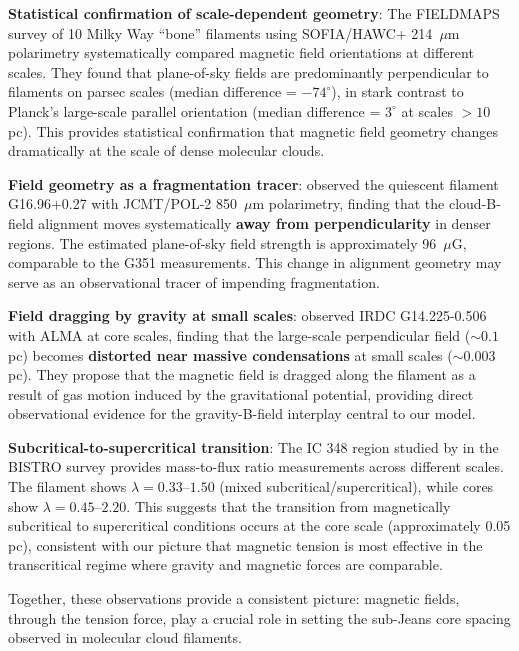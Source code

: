 \documentclass[11pt,a4paper]{article}
\begin{document}
\textbf{Statistical confirmation of scale-dependent geometry}: The FIELDMAPS survey of 10 Milky Way ``bone'' filaments \citep{Coude2025} using SOFIA/HAWC+ 214~$\mu$m polarimetry systematically compared magnetic field orientations at different scales. They found that plane-of-sky fields are predominantly perpendicular to filaments on parsec scales (median difference = $-74^{\circ}$), in stark contrast to Planck's large-scale parallel orientation (median difference = $3^{\circ}$ at scales $>10$ pc). This provides statistical confirmation that magnetic field geometry changes dramatically at the scale of dense molecular clouds.

\textbf{Field geometry as a fragmentation tracer}: \citet{Gu2024} observed the quiescent filament G16.96+0.27 with JCMT/POL-2 850~$\mu$m polarimetry, finding that the cloud-B-field alignment moves systematically \textbf{away from perpendicularity} in denser regions. The estimated plane-of-sky field strength is approximately 96~$\mu$G, comparable to the G351 measurements. This change in alignment geometry may serve as an observational tracer of impending fragmentation.

\textbf{Field dragging by gravity at small scales}: \citet{AnezLopez2026} observed IRDC G14.225-0.506 with ALMA at core scales, finding that the large-scale perpendicular field ($\sim0.1$ pc) becomes \textbf{distorted near massive condensations} at small scales ($\sim0.003$ pc). They propose that the magnetic field is dragged along the filament as a result of gas motion induced by the gravitational potential, providing direct observational evidence for the gravity-B-field interplay central to our model.

\textbf{Subcritical-to-supercritical transition}: The IC 348 region studied by \citet{Choi2024b} in the BISTRO survey provides mass-to-flux ratio measurements across different scales. The filament shows $\lambda = 0.33$--$1.50$ (mixed subcritical/supercritical), while cores show $\lambda = 0.45$--$2.20$. This suggests that the transition from magnetically subcritical to supercritical conditions occurs at the core scale (approximately 0.05 pc), consistent with our picture that magnetic tension is most effective in the transcritical regime where gravity and magnetic forces are comparable.

Together, these observations provide a consistent picture: magnetic fields, through the tension force, play a crucial role in setting the sub-Jeans core spacing observed in molecular cloud filaments.
\end{document}
